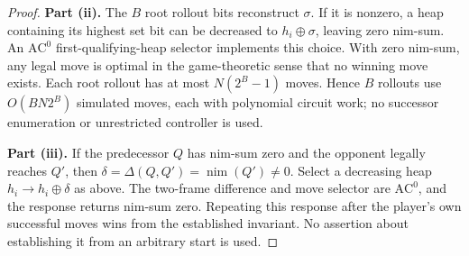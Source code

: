 \documentclass[11pt]{article}
\newcommand{\AC}{\mathrm{AC}}
\theoremstyle{plain}
\theoremstyle{definition}
\theoremstyle{remark}
\numberwithin{equation}{section}
\begin{document}
\begin{proof}
\textbf{Part (ii).} The $B$ root rollout bits reconstruct $\sigma$. If it is nonzero, a heap containing its highest set bit can be decreased to $h_i\oplus\sigma$, leaving zero nim-sum. An $\AC^0$ first-qualifying-heap selector implements this choice. With zero nim-sum, any legal move is optimal in the game-theoretic sense that no winning move exists. Each root rollout has at most $N(2^B-1)$ moves. Hence $B$ rollouts use $O(BN2^B)$ simulated moves, each with polynomial circuit work; no successor enumeration or unrestricted controller is used.

\textbf{Part (iii).} If the predecessor $Q$ has nim-sum zero and the opponent legally reaches $Q'$, then $\delta=\Delta(Q,Q')=\operatorname{nim}(Q')\ne0$. Select a decreasing heap $h_i\to h_i\oplus\delta$ as above. The two-frame difference and move selector are $\AC^0$, and the response returns nim-sum zero. Repeating this response after the player's own successful moves wins from the established invariant. No assertion about establishing it from an arbitrary start is used.
\end{proof}
\end{document}
